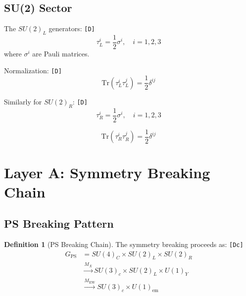 \documentclass[11pt,a4paper]{article}
\newcommand{\tagD}{\textcolor{green!50!black}{\texttt{[D]}}}
\newcommand{\tagDc}{\textcolor{blue!70!black}{\texttt{[Dc]}}}
\theoremstyle{definition}
\newtheorem{definition}{Definition}[section]
\begin{document}
\subsection{SU(2) Sector}
\label{subsec:su2-sector}

The $SU(2)_L$ generators: \tagD{}
\begin{equation}
\label{eq:su2l-generators}
\tau^i_L = \frac{1}{2} \sigma^i, \quad i = 1, 2, 3
\end{equation}
where $\sigma^i$ are Pauli matrices.

Normalization: \tagD{}
\begin{equation}
\label{eq:su2l-norm}
\text{Tr}(\tau^i_L \tau^j_L) = \frac{1}{2} \delta^{ij}
\end{equation}

Similarly for $SU(2)_R$: \tagD{}
\begin{equation}
\label{eq:su2r-generators}
\tau^i_R = \frac{1}{2} \sigma^i, \quad i = 1, 2, 3
\end{equation}

\begin{equation}
\label{eq:su2r-norm}
\text{Tr}(\tau^i_R \tau^j_R) = \frac{1}{2} \delta^{ij}
\end{equation}

\section{Layer A: Symmetry Breaking Chain}
\label{sec:breaking}

\subsection{PS Breaking Pattern}
\label{subsec:ps-breaking}

\begin{definition}[PS Breaking Chain]
\label{def:breaking-chain}
The symmetry breaking proceeds as: \tagDc{}
\begin{equation}
\label{eq:breaking-chain}
\boxed{
\begin{aligned}
G_{\text{PS}} &= SU(4)_C \times SU(2)_L \times SU(2)_R \\
&\xrightarrow{M_X} SU(3)_c \times SU(2)_L \times U(1)_Y \\
&\xrightarrow{M_{\text{EW}}} SU(3)_c \times U(1)_{\text{em}}
\end{aligned}
}
\end{equation}
\end{definition}
\end{document}
